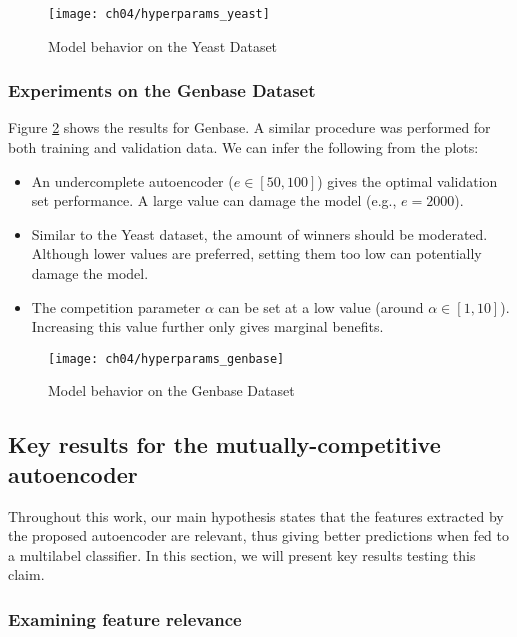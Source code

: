 \begin{figure}[!h]
  \centering
  \texttt{[image: ch04/hyperparams\_yeast]}
  \caption{Model behavior on the Yeast Dataset}
  \label{results:mc_char_yeast}
\end{figure}

\subsubsection{Experiments on the Genbase Dataset}

Figure \ref{results:mc_char_genbase} shows the results for Genbase. A similar
procedure was performed for both training and validation data. We can infer
the following from the plots:

\begin{itemize}
  \item An undercomplete autoencoder ($e\in\left[50,100\right]$) gives the
  optimal validation set performance. A large value can damage the model (e.g.,
  $e=2000$).
  \item Similar to the Yeast dataset, the amount of winners should be
  moderated. Although lower values are preferred, setting them too low can
  potentially damage the model.
  \item The competition parameter $\alpha$ can be set at a low value (around
  $\alpha \in \left[1,10\right]$). Increasing this value further only gives
  marginal benefits.
\end{itemize}

\begin{figure}[!h]
  \centering
  \texttt{[image: ch04/hyperparams\_genbase]}
  \caption{Model behavior on the Genbase Dataset}
  \label{results:mc_char_genbase}
\end{figure}

\subsection{Key results for the mutually-competitive autoencoder}

Throughout this work, our main hypothesis states that the features extracted by
the proposed autoencoder are relevant, thus giving better predictions when
fed to a multilabel classifier. In this section, we will present key results
testing this claim.

\subsubsection{Examining feature relevance}

